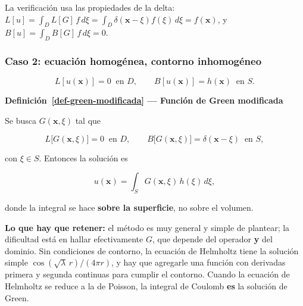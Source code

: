 \documentclass[
  spanish,
  a4paper,
]{scrbook}
\theoremstyle{definition}
\theoremstyle{plain}
\theoremstyle{definition}
\theoremstyle{plain}
\theoremstyle{definition}
\theoremstyle{remark}
\begin{document}
La verificación usa las propiedades de la delta:
\(L[u] = \int_D L[G]\,f\,d\xi = \int_D \delta(\mathbf{x}-\xi)f(\xi)\,d\xi = f(\mathbf{x})\),
y \(B[u] = \int_D B[G]\,f\,d\xi = 0\).

\subsubsection{Caso 2: ecuación homogénea, contorno
inhomogéneo}\label{caso-2-ecuaciuxf3n-homoguxe9nea-contorno-inhomoguxe9neo}

\[
L[u(\mathbf{x})] = 0 \ \text{ en } D, \qquad
B[u(\mathbf{x})] = h(\mathbf{x}) \ \text{ en } S .
\]

\begin{tcolorbox}[enhanced jigsaw, arc=.35mm, bottomrule=.15mm, breakable, colback=white, colframe=quarto-callout-note-color-frame, left=2mm, leftrule=.75mm, opacityback=0, rightrule=.15mm, toprule=.15mm]
\begin{minipage}[t]{5.5mm}
\textcolor{quarto-callout-note-color}{\faInfo}
\end{minipage}%
\begin{minipage}[t]{\textwidth - 5.5mm}

\vspace{-3mm}\textbf{Definición~\ref{def-green-modificada} --- Función de Green modificada}\vspace{3mm}

Se busca \(G(\mathbf{x},\xi)\) tal que

\[
L\big[G(\mathbf{x},\xi)\big] = 0 \ \text{ en } D, \qquad
B\big[G(\mathbf{x},\xi)\big] = \delta(\mathbf{x}-\xi) \ \text{ en } S ,
\]

con \(\xi \in S\). Entonces la solución es

\[
u(\mathbf{x}) = \int_S G(\mathbf{x},\xi)\,h(\xi)\,d\xi ,
\]

donde la integral se hace \textbf{sobre la superficie}, no sobre el
volumen.

\end{minipage}%
\end{tcolorbox}

\textbf{Lo que hay que retener:} el método es muy general y simple de
plantear; la dificultad está en hallar efectivamente \(G\), que depende
del operador \textbf{y} del dominio. Sin condiciones de contorno, la
ecuación de Helmholtz tiene la solución simple
\(\cos(\sqrt{\lambda}\,r)/(4\pi r)\), y hay que agregarle una función
con derivadas primera y segunda continuas para cumplir el contorno.
Cuando la ecuación de Helmholtz se reduce a la de Poisson, la integral
de Coulomb \textbf{es} la solución de Green.
\end{document}

